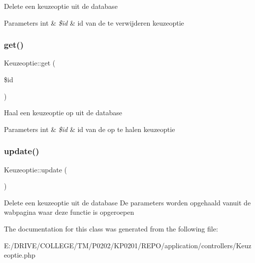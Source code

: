 Delete een keuzeoptie uit de database 
\begin{DoxyParams}[1]{Parameters}
int & {\em \$id} & id van de te verwijderen keuzeoptie \\
\hline
\end{DoxyParams}
\mbox{\label{class_keuzeoptie_abe1857ac53d46fe3f2ff1e601c46739a}} 
\subsubsection{\texorpdfstring{get()}{get()}}
{\footnotesize\ttfamily Keuzeoptie\+::get (\begin{DoxyParamCaption}\item[{}]{\$id }\end{DoxyParamCaption})}

Haal een keuzeoptie op uit de database 
\begin{DoxyParams}[1]{Parameters}
int & {\em \$id} & id van de op te halen keuzeoptie \\
\hline
\end{DoxyParams}
\mbox{\label{class_keuzeoptie_abb3bade0f37d81dc061789c5a3dba930}} 
\subsubsection{\texorpdfstring{update()}{update()}}
{\footnotesize\ttfamily Keuzeoptie\+::update (\begin{DoxyParamCaption}{ }\end{DoxyParamCaption})}

Delete een keuzeoptie uit de database De parameters worden opgehaald vanuit de wabpagina waar deze functie is opgeroepen 

The documentation for this class was generated from the following file\+:\begin{DoxyCompactItemize}
\item 
E\+:/\+D\+R\+I\+V\+E/\+C\+O\+L\+L\+E\+G\+E/\+T\+M/\+P0202/\+K\+P0201/\+R\+E\+P\+O/application/controllers/Keuzeoptie.\+php\end{DoxyCompactItemize}
